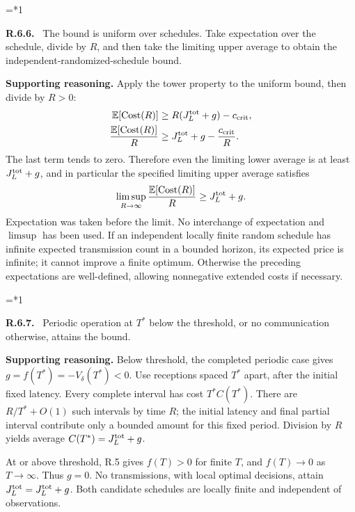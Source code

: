 \documentclass[12pt,letterpaper]{article}
\newcommand{\E}{\mathbb E}
\newenvironment{proofstep}[2]{%
  \begin{list}{}{\leftmargin=\dimexpr 0.17in*#2\relax%
  \setlength{\rightmargin}{0pt}\setlength{\topsep}{5pt}\setlength{\parsep}{2pt}}%
  \item[]\textbf{\textcolor{ink}{#1.}}\ }{\end{list}}
\begin{document}
\begin{proofstep}{R.6.6}{1}
\label{step:R.6.6}
The bound is uniform over schedules. Take expectation over the schedule, divide by $R$, and then take the limiting upper average to obtain the independent-randomized-schedule bound.

\textbf{Supporting reasoning.}
Apply the tower property to the uniform bound, then divide by $R>0$:
\begin{align*}
\E[\mathrm{Cost}(R)]
&\ge R(J_L^{\rm tot}+g)-c_{\rm crit},\\
\frac{\E[\mathrm{Cost}(R)]}{R}
&\ge J_L^{\rm tot}+g-\frac{c_{\rm crit}}R.
\end{align*}
The last term tends to zero. Therefore even the limiting lower average is at least $J_L^{\rm tot}+g$, and in particular the specified limiting upper average satisfies
\[
\limsup_{R\to\infty}\frac{\E[\mathrm{Cost}(R)]}{R}
\ge J_L^{\rm tot}+g.
\]
Expectation was taken before the limit. No interchange of expectation and $\limsup$ has been used. If an independent locally finite random schedule has infinite expected transmission count in a bounded horizon, its expected price is infinite; it cannot improve a finite optimum. Otherwise the preceding expectations are well-defined, allowing nonnegative extended costs if necessary.
\par{}
\end{proofstep}

\begin{proofstep}{R.6.7}{1}
\label{step:R.6.7}
Periodic operation at $T^*$ below the threshold, or no communication otherwise, attains the bound.

\textbf{Supporting reasoning.}
Below threshold, the completed periodic case gives $g=f(T^*)=-V_\delta(T^*)<0$. Use receptions spaced $T^*$ apart, after the initial fixed latency. Every complete interval has cost $T^*C(T^*)$. There are $R/T^*+O(1)$ such intervals by time $R$; the initial latency and final partial interval contribute only a bounded amount for this fixed period. Division by $R$ yields average $C(T^*)=J_L^{\rm tot}+g$.

At or above threshold, R.5 gives $f(T)>0$ for finite $T$, and $f(T)\to0$ as $T\to\infty$. Thus $g=0$. No transmissions, with local optimal decisions, attain $J_L^{\rm tot}=J_L^{\rm tot}+g$. Both candidate schedules are locally finite and independent of observations.
\par{}
\end{proofstep}
\end{document}
